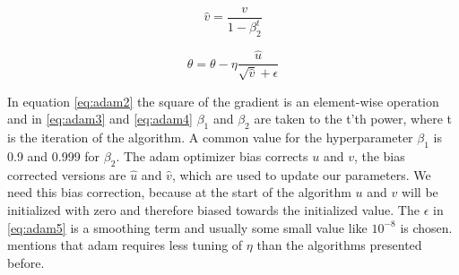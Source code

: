 \documentclass[aodsor,preprint]{imsart}
\numberwithin{equation}{section}
\theoremstyle{plain}
\begin{document}
\begin{equation} \label{eq:adam4}
\hat{v} = \frac{v}{1-\beta_{2}^t}
\end{equation}

\begin{equation} \label{eq:adam5}
\theta = \theta - \eta \frac{\hat{u}}{\sqrt{\hat{v}} + \epsilon}
\end{equation}

In equation \ref{eq:adam2} the square of the gradient is an element-wise operation and in \ref{eq:adam3} and \ref{eq:adam4} $\beta_{1}$ and $\beta_{2}$ are taken to the t'th power, where t is the iteration of the algorithm. A common value for the hyperparameter $\beta_{1}$ is 0.9 and 0.999 for $\beta_{2}$. The adam optimizer bias corrects $u$ and $v$, the bias corrected versions are $\hat{u}$ and $\hat{v}$, which are used to update our parameters. We need this bias correction, because at the start of the algorithm $u$ and $v$ will be initialized with zero and therefore biased towards the initialized value.
The $\epsilon$ in \ref{eq:adam5} is a smoothing term and usually some small value like $10^{-8}$ is chosen. \cite{geron2019hands} mentions that adam requires less tuning of $\eta$ than the algorithms presented before.
\end{document}
